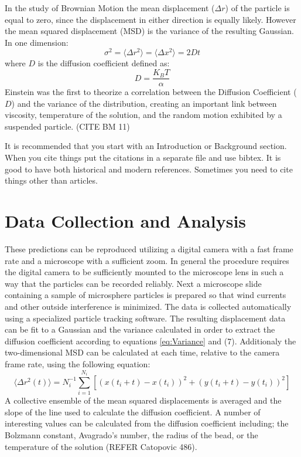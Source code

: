 \documentclass[aps,prb,twocolumn,groupedaddress,nofootinbib,floatfix]{revtex4}
\newcommand{\beq}{\begin{equation}}
\newcommand{\eeq}{\end{equation}}
\begin{document}
In the study of Brownian Motion the mean displacement ($\Delta{}r$) of the particle is equal to zero, since the displacement in either direction is equally likely. However the mean squared displacement (MSD) is the variance of the resulting Gaussian. In one dimension:
\beq
\sigma^2=\langle{}\Delta{}r^2\rangle{}=\langle{}\Delta{}x^2\rangle{}=2Dt
\label{eq:Displacement}
\eeq
where $D$ is the diffusion coefficient defined as:
\beq
D=\frac{K_BT}{\alpha}
\label{eq:Diffusion Coeff}
\eeq
Einstein was the first to theorize a correlation between the Diffusion Coefficient ($D$) and the variance of the distribution, creating an important link between viscosity, temperature of the solution, and the random motion exhibited by a suspended particle. (CITE BM 11)



It is recommended that you start with an Introduction or Background
section.  When you cite things \cite{Foner1} put the citations in a separate file and
use bibtex.   It is good to have both historical and modern references. \cite{Tickle,Basso}
Sometimes you need to cite things other than articles. \cite{UnitsTable}
%
\section*{Data Collection and Analysis}
These predictions can be reproduced utilizing a digital camera with a fast frame rate and a microscope with a sufficient zoom. In general the procedure requires the digital camera to be sufficiently mounted to the microscope lens in such a way that the particles can be recorded reliably. Next a microscope slide containing a sample of microsphere particles is prepared so that wind currents and other outside interference is minimized. The data is collected automatically using a specialized particle tracking software. The resulting displacement data can be fit to a Gaussian and the variance calculated in order to extract the diffusion coefficient according to equations \ref{eq:Variance} and (7). Additionaly the two-dimensional MSD can be calculated at each time, relative to the camera frame rate, using the following equation:
\beq
\langle\Delta{}r^{2}(t)\rangle{}=N_{i}^{-1}\sum_{i=1}^{N_i}\left[\left(x\left(t_{i}+t\right)-x\left(t_i\right)\right)^2+\left(y\left(t_{i}+t\right)-y\left(t_i\right)\right)^2\right]
\label{eq:two2dMSD}
\eeq
A collective ensemble of the mean squared displacements is averaged and the slope of the line used to calculate the diffusion coefficient. A number of interesting values can be calculated from the diffusion coefficient including; the Bolzmann constant, Avagrado's number, the radius of the bead, or the temperature of the solution (REFER Catopovic 486).
\end{document}
